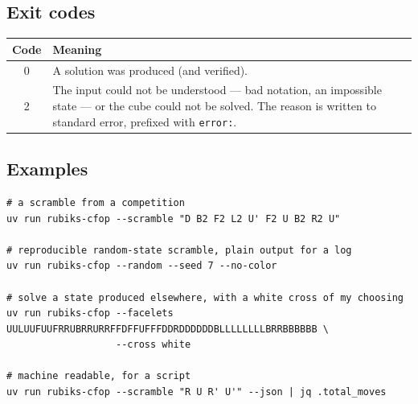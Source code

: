 \subsection{Exit codes}

\begin{center}
\begin{tabular}{@{}cl@{}}
\toprule
Code & Meaning \\
\midrule
0 & A solution was produced (and verified). \\
2 & The input could not be understood --- bad notation, an impossible state --- or
the cube could not be solved.  The reason is written to standard error, prefixed
with \texttt{error:}. \\
\bottomrule
\end{tabular}
\end{center}

\subsection{Examples}

\begin{lstlisting}[style=shell]
# a scramble from a competition
uv run rubiks-cfop --scramble "D B2 F2 L2 U' F2 U B2 R2 U"

# reproducible random-state scramble, plain output for a log
uv run rubiks-cfop --random --seed 7 --no-color

# solve a state produced elsewhere, with a white cross of my choosing
uv run rubiks-cfop --facelets UULUUFUUFRRUBRRURRFFDFFUFFFDDRDDDDDDBLLLLLLLLBRRBBBBBB \
                   --cross white

# machine readable, for a script
uv run rubiks-cfop --scramble "R U R' U'" --json | jq .total_moves
\end{lstlisting}

